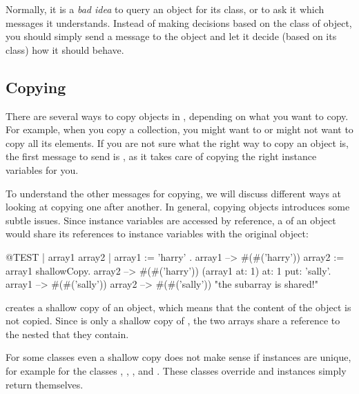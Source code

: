 \documentclass[a4paper,10pt,twoside]{book}
\begin{document}
Normally, it is a \emph{bad idea} to query an object for its class, or to ask it which messages it understands.
Instead of making decisions based on the class of object, you should simply send a message to the object and let it decide (\ie based on its class) how it should behave.

\subsection{Copying}

There are several ways to copy objects in \sq, depending on what you want to copy. For example, when you copy a collection, you might want to or might not want to copy all its elements. If you are not sure what the right way to copy an object is, the first message to send is , as it takes care of copying the right instance variables for you.

To understand the other messages for copying, we will discuss different ways at looking at copying one after another.
In general, copying objects introduces some subtle issues.
Since instance variables are accessed by reference, a  of an object would share its references to instance variables with the original object:

\begin{code}{@TEST | array1 array2 |}
array1 := { { 'harry' } }.
array1 --> #(#('harry'))
array2 := array1 shallowCopy.
array2 --> #(#('harry'))
(array1 at: 1) at: 1 put: 'sally'.
array1 --> #(#('sally'))
array2 --> #(#('sally'))    "the subarray is shared!"
\end{code}

 creates a shallow copy of an object, which means that the content of the object is not copied.
Since  is only a shallow copy of , the two arrays share a reference to the nested  that they contain.

For some classes even a shallow copy does not make sense if instances are unique, for example for the classes , , ,  and . These classes override  and instances simply return themselves.
\end{document}
